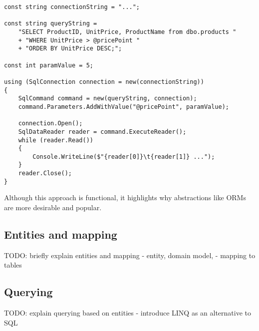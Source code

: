 \begin{lstlisting}[language=CSharp]
const string connectionString = "...";

const string queryString =
    "SELECT ProductID, UnitPrice, ProductName from dbo.products "
    + "WHERE UnitPrice > @pricePoint "
    + "ORDER BY UnitPrice DESC;";

const int paramValue = 5;

using (SqlConnection connection = new(connectionString))
{
    SqlCommand command = new(queryString, connection);
    command.Parameters.AddWithValue("@pricePoint", paramValue);

    connection.Open();
    SqlDataReader reader = command.ExecuteReader();
    while (reader.Read())
    {
        Console.WriteLine($"{reader[0]}\t{reader[1]} ...");
    }
    reader.Close();
}
\end{lstlisting}

Although this approach is functional, it highlights why abstractions like ORMs are more desirable and popular.

\subsection{Entities and mapping}

TODO: briefly explain entities and mapping
- entity, domain model,
- mapping to tables

\subsection{Querying}

TODO: explain querying based on entities
- introduce LINQ as an alternative to SQL